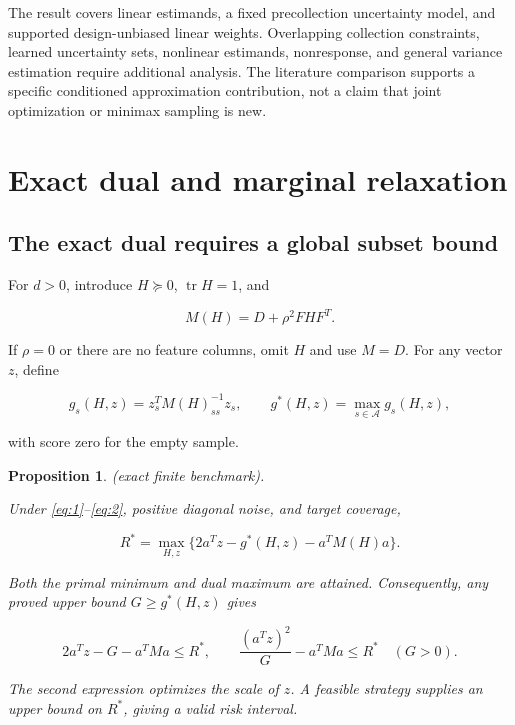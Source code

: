 \documentclass[11pt]{article}
\newtheorem{proposition}[theorem]{Proposition}
\begin{document}
The result covers linear estimands, a fixed precollection uncertainty
model, and supported design-unbiased linear weights. Overlapping
collection constraints, learned uncertainty sets, nonlinear estimands,
nonresponse, and general variance estimation require additional
analysis. The literature comparison supports a specific conditioned
approximation contribution, not a claim that joint optimization or
minimax sampling is new.

\appendix

\section{Exact dual and marginal
relaxation}\label{exact-dual-and-marginal-relaxation}

\subsection{The exact dual requires a global subset
bound}\label{the-exact-dual-requires-a-global-subset-bound}

For \(d>0\), introduce \(H\succeq0\), \(\operatorname{tr}H=1\), and

\[
M(H)=D+\rho^2FHF^T.
\]

If \(\rho=0\) or there are no feature columns, omit \(H\) and use
\(M=D\). For any vector \(z\), define

\begin{equation}\label{eq:5}
g_s(H,z)=z_s^TM(H)_{ss}^{-1}z_s,
\qquad g^*(H,z)=\max_{s\in\mathcal A}g_s(H,z), 
\end{equation}

with score zero for the empty sample.

\begin{proposition}\label{th:1} (exact finite benchmark).

Under \eqref{eq:1}--\eqref{eq:2}, positive diagonal noise, and target
coverage,

\begin{equation}\label{eq:6}
R^*=\max_{H,z}
\{2a^Tz-g^*(H,z)-a^TM(H)a\}. 
\end{equation}

Both the primal minimum and dual maximum are attained. Consequently, any
proved upper bound \(G\ge g^*(H,z)\) gives

\begin{equation}\label{eq:7}
2a^Tz-G-a^TMa\le R^*,
\qquad
\frac{(a^Tz)^2}{G}-a^TMa\le R^*\quad(G>0). 
\end{equation}

The second expression optimizes the scale of \(z\). A feasible strategy
supplies an upper bound on \(R^*\), giving a valid risk interval.

\end{proposition}
\end{document}
